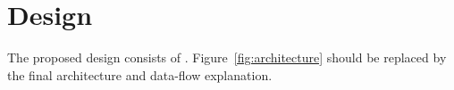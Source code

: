 \section{Design}
The proposed design consists of . Figure~\ref{fig:architecture} should be replaced by the final architecture and data-flow explanation.
